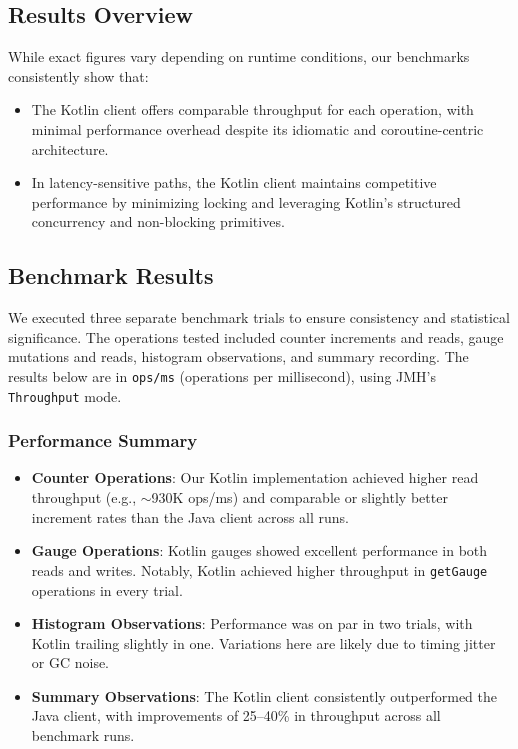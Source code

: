\subsection*{Results Overview}

While exact figures vary depending on runtime conditions, our benchmarks consistently show that:
\begin{itemize}
    \item The Kotlin client offers comparable throughput for each operation, with minimal performance overhead despite its idiomatic and coroutine-centric architecture.
    \item In latency-sensitive paths, the Kotlin client maintains competitive performance by minimizing locking and leveraging Kotlin’s structured concurrency and non-blocking primitives.
\end{itemize}


\subsection*{Benchmark Results}

We executed three separate benchmark trials to ensure consistency and statistical significance. The operations tested included counter increments and reads, gauge mutations and reads, histogram observations, and summary recording. The results below are in \texttt{ops/ms} (operations per millisecond), using JMH's \texttt{Throughput} mode.

\subsubsection*{Performance Summary}

\begin{itemize}
    \item \textbf{Counter Operations}: Our Kotlin implementation achieved higher read throughput (e.g., $\sim$930K ops/ms) and comparable or slightly better increment rates than the Java client across all runs.
    \item \textbf{Gauge Operations}: Kotlin gauges showed excellent performance in both reads and writes. Notably, Kotlin achieved higher throughput in \texttt{getGauge} operations in every trial.
    \item \textbf{Histogram Observations}: Performance was on par in two trials, with Kotlin trailing slightly in one. Variations here are likely due to timing jitter or GC noise.
    \item \textbf{Summary Observations}: The Kotlin client consistently outperformed the Java client, with improvements of 25–40\% in throughput across all benchmark runs.
\end{itemize}

